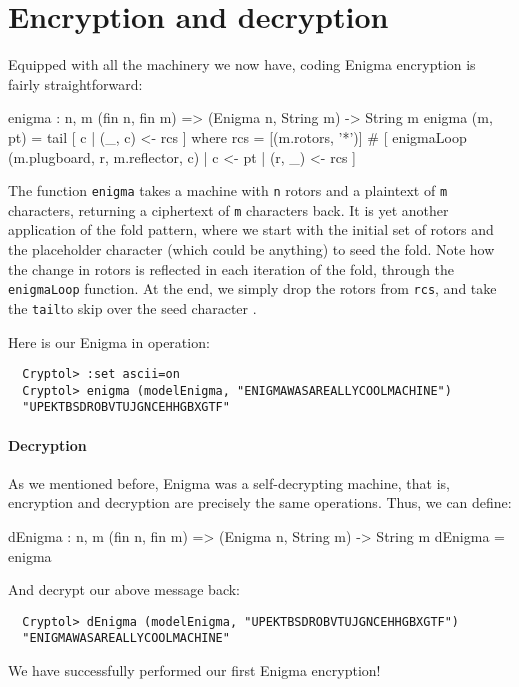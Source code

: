 \section{Encryption and decryption}
\label{enigma:encdec}

Equipped with all the machinery we now have, coding Enigma encryption
is fairly straightforward:
\begin{code}
  enigma : {n, m} (fin n, fin m) => (Enigma n, String m) -> String m
  enigma (m, pt) = tail [ c | (_, c) <- rcs ]
    where rcs = [(m.rotors, '*')] # 
                [ enigmaLoop (m.plugboard, r, m.reflector, c)
                | c      <- pt
                | (r, _) <- rcs
                ]
\end{code}
The function {\tt enigma} takes a machine with {\tt n} rotors and a
plaintext of {\tt m} characters, returning a ciphertext of {\tt m}
characters back.  It is yet another application of the fold pattern,
where we start with the initial set of rotors and the placeholder
character {\tt *} (which could be anything) to seed the fold.\indFold
Note how the change in rotors is reflected in each iteration of the
fold, through the {\tt enigmaLoop} function. At the end, we simply
drop the rotors from {\tt rcs}, and take the {\tt tail}\indTail to
skip over the seed character {\tt *}.

Here is our Enigma in operation:
\begin{Verbatim}
  Cryptol> :set ascii=on
  Cryptol> enigma (modelEnigma, "ENIGMAWASAREALLYCOOLMACHINE")
  "UPEKTBSDROBVTUJGNCEHHGBXGTF"
\end{Verbatim}

\paragraph*{Decryption} As we mentioned before, Enigma was a
self-decrypting machine, that is, encryption and decryption are
precisely the same operations. Thus, we can define:
\begin{code}
  dEnigma : {n, m} (fin n, fin m) => (Enigma n, String m) -> String m
  dEnigma = enigma
\end{code}
And decrypt our above message back:
\begin{Verbatim}
  Cryptol> dEnigma (modelEnigma, "UPEKTBSDROBVTUJGNCEHHGBXGTF")
  "ENIGMAWASAREALLYCOOLMACHINE"
\end{Verbatim}
We have successfully performed our first Enigma encryption!

